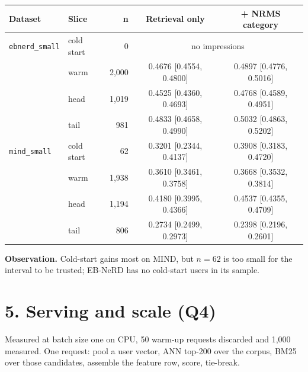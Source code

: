 \documentclass[11pt,a4paper]{article}
\begin{document}
\begin{table}[H]
\centering\footnotesize
\begin{tabular}{llrcc}
\toprule
\textbf{Dataset} & \textbf{Slice} & \textbf{n} & \textbf{Retrieval only} & \textbf{+ NRMS category} \\
\midrule
\texttt{ebnerd\_small} & cold start & 0 & \multicolumn{2}{c}{no impressions} \\
 & warm & 2,000 & 0.4676 [0.4554, 0.4800] & 0.4897 [0.4776, 0.5016] \\
 & head & 1,019 & 0.4525 [0.4360, 0.4693] & 0.4768 [0.4589, 0.4951] \\
 & tail & 981 & 0.4833 [0.4658, 0.4990] & 0.5032 [0.4863, 0.5202] \\
\midrule
\texttt{mind\_small} & cold start & 62 & 0.3201 [0.2344, 0.4137] & 0.3908 [0.3183, 0.4720] \\
 & warm & 1,938 & 0.3610 [0.3461, 0.3758] & 0.3668 [0.3532, 0.3814] \\
 & head & 1,194 & 0.4180 [0.3995, 0.4366] & 0.4537 [0.4355, 0.4709] \\
 & tail & 806 & 0.2734 [0.2499, 0.2973] & 0.2398 [0.2196, 0.2601] \\
\bottomrule
\end{tabular}
\end{table}

\textbf{Observation.} Cold-start gains most on MIND, but $n=62$ is too small for the interval to be trusted; EB-NeRD has no cold-start users in its sample.

\section*{5. Serving and scale (Q4)}

Measured at batch size one on CPU, 50 warm-up requests discarded and 1{,}000
measured. One request: pool a user vector, ANN top-200 over the corpus, BM25 over
those candidates, assemble the feature row, score, tie-break.
\end{document}
